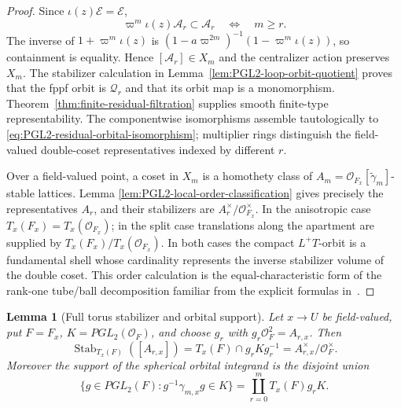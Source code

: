\documentclass[11pt]{article}
\newtheorem{lemma}[theorem]{Lemma}
\theoremstyle{definition}
\theoremstyle{remark}
\begin{document}
\begin{proof}
Since $\iota(z)\mathcal E=\mathcal E$,
\[
 \varpi^m\iota(z)\mathcal A_r\subset\mathcal A_r
 \quad\Longleftrightarrow\quad m\ge r.
\]
The inverse of $1+\varpi^m\iota(z)$ is
$(1-a\varpi^{2m})^{-1}(1-\varpi^m\iota(z))$, so containment is equality.
Hence $[\mathcal A_r]\in X_m$ and the centralizer action preserves $X_m$.
The stabilizer calculation in Lemma~\ref{lem:PGL2-loop-orbit-quotient} proves
that the fppf orbit is $\mathscr Q_r$ and that its orbit map is a monomorphism.
Theorem~\ref{thm:finite-residual-filtration} supplies smooth finite-type
representability.  The componentwise isomorphisms assemble tautologically to
\eqref{eq:PGL2-residual-orbital-isomorphism}; multiplier rings distinguish the
field-valued double-coset representatives indexed by different $r$.

Over a field-valued point, a coset in $X_m$ is a homothety class of
$A_m=\mathcal O_{F_x}[\widetilde\gamma_m]$-stable lattices.  Lemma
\ref{lem:PGL2-local-order-classification} gives precisely the representatives
$A_r$, and their stabilizers are
$A_r^\times/\mathcal O_{F_x}^\times$.  In the anisotropic case
$T_x(F_x)=T_x(\mathcal O_{F_x})$; in the split case translations along the
apartment are supplied by $T_x(F_x)/T_x(\mathcal O_{F_x})$.  In both cases
the compact $L^+T$-orbit is a fundamental shell whose cardinality represents
the inverse stabilizer volume of the double coset.  This order calculation is
the equal-characteristic form of the rank-one tube/ball decomposition familiar
from the explicit formulas in~\cite[\S5.8, (5.8.4); \S5.9,
(5.9.7)--(5.9.8)]{KottwitzOrbital}.
\end{proof}

\begin{lemma}[Full torus stabilizer and orbital support]
\label{lem:PGL2-full-stabilizer-support}
Let $x\to U$ be field-valued, put $F=F_x$, $K=PGL_2(\mathcal O_F)$, and
choose $g_r$ with $g_r\mathcal O_F^2=A_{r,x}$.  Then
\begin{equation}
 \operatorname{Stab}_{T_x(F)}([A_{r,x}])
 =T_x(F)\cap g_rKg_r^{-1}
 =A_{r,x}^\times/\mathcal O_F^\times.
 \label{eq:PGL2-full-torus-stabilizer}
\end{equation}
Moreover the support of the spherical orbital integrand is the disjoint union
\begin{equation}
 \{g\in PGL_2(F):g^{-1}\gamma_{m,x}g\in K\}
 =\coprod_{r=0}^m T_x(F)g_rK.
 \label{eq:PGL2-orbital-support-decomposition}
\end{equation}
\end{lemma}
\end{document}
